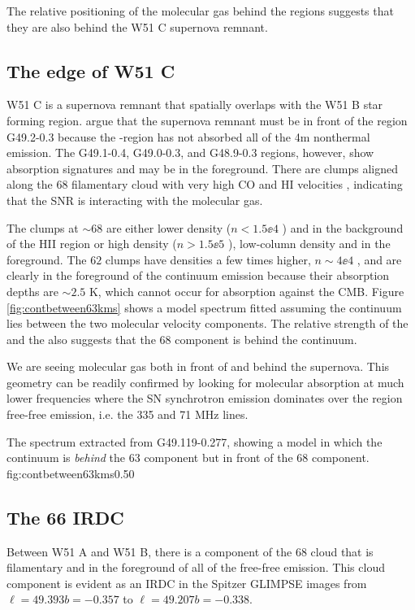 The relative positioning of the molecular gas behind the \hii regions suggests
that they are also behind the W51 C supernova remnant.

\subsection{The edge of W51 C}
W51 C is a supernova remnant that spatially overlaps with the W51 B star
forming region.  \citet{Brogan2013a} argue that the supernova remnant must be
in front of the \hii region G49.2-0.3 because the \hii-region has not absorbed
all of the 4m nonthermal emission.  The G49.1-0.4, G49.0-0.3, and G48.9-0.3
regions, however, show absorption signatures and may be in the foreground.
There are clumps aligned along the 68 \kms filamentary cloud with very high CO
and HI velocities \citep{Koo1997b,Koo1997c,Brogan2013a}, indicating that the
SNR is interacting with the molecular gas.

The clumps at $\sim68$ \kms are either lower density ($n<1.5\ee{4}$ \percc) and in the
background of the HII region or high density ($n>1.5\ee{5}$ \percc), low-column
density and in the foreground.  The $62$ \kms clumps have densities a few times
higher, $n\sim4\ee{4}$ \percc, and are clearly in the foreground of the
continuum emission because their absorption depths are $\sim2.5$ K, which
cannot occur for absorption against the CMB.  Figure \ref{fig:contbetween63kms}
shows a model spectrum fitted assuming the continuum lies between the two
molecular velocity components.  The relative strength of the \thirteenco and
the \formaldehyde also suggests that the 68 \kms component is behind the
continuum.

We are seeing molecular gas both in front of and behind the supernova.  This
geometry can be readily confirmed by looking for molecular absorption at much
lower frequencies where the SN synchrotron emission dominates over the \hii
region free-free emission, i.e. the 335 and 71 MHz \para lines.

{The spectrum extracted from G49.119-0.277, showing a model in which the continuum
is \emph{behind} the 63 \kms component but in front of the 68 \kms component.}
{fig:contbetween63kms}{0.5}{0}

\subsection{The 66 \kms IRDC}
Between W51 A and W51 B, there is a component of the 68 \kms cloud that is
filamentary and in the foreground of all of the free-free emission.
This cloud component is evident as an IRDC in the Spitzer GLIMPSE images from
$\ell=49.393 b=-0.357$ to $\ell=49.207 b=-0.338$.


